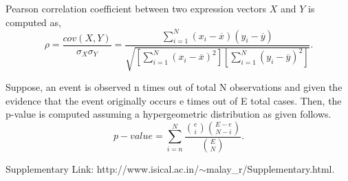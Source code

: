 \documentclass[11pt]{article}
\begin{document}
Pearson correlation coefficient between two expression vectors $X$ and $Y$ is computed
as,
\begin{equation}\label{Correlation}
\rho =\frac{cov(X,Y)}{\sigma_{X}\sigma_{Y}}
=\frac{\sum_{i=1}^N(x_{i}-\overline{x})(y_{i}-\overline{y})}
{\sqrt{[\sum_{i=1}^N(x_{i}-\overline{x})^{2}][\sum_{i=1}^N(y_{i}-\overline{y})^{2}]}}.
\end{equation}

Suppose, an event is observed n times out of total N observations and given the evidence that the event originally occurs e times out of E total cases. Then, the p-value is computed assuming a hypergeometric distribution as given follows.
\begin{equation}
p-value = \sum_{i=n}^{N} \frac{{e \choose i} {E-e \choose N-i}}{{E \choose N}}.\nonumber
\end{equation}

Supplementary Link: http://www.isical.ac.in/$\sim$malay\_r/Supplementary.html.
\end{document}
